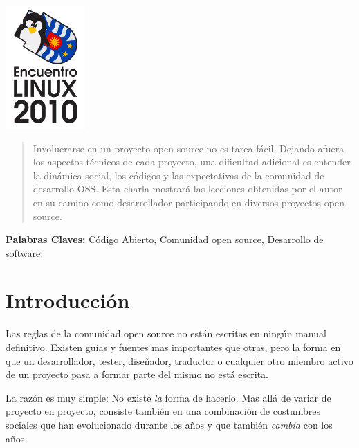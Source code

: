 \begin{minipage}{0.1in}
  \includegraphics[width=1.2in]{images/logo.png}
\end{minipage}
\hfill
\begin{minipage}{6in}
  \maketitle
\end{minipage}
\hfill
\begin{minipage}{7in}
\end{minipage}
  \thispagestyle{empty}

\begin{abstract}

  Involucrarse en un proyecto open source no es tarea fácil. Dejando afuera los
  aspectos técnicos de cada proyecto, una dificultad adicional es entender la
  dinámica social, los códigos y las expectativas de la comunidad de desarrollo
  OSS. Esta charla mostrará las lecciones obtenidas por el autor en su camino
  como desarrollador participando en diversos proyectos open source.

\end{abstract}

\textbf{Palabras Claves:} Código Abierto, Comunidad open source, Desarrollo de
software.

\section*{Introducción}

Las reglas de la comunidad open source no están escritas en ningún manual
definitivo. Existen guías y fuentes mas importantes que otras, pero la forma en
que un desarrollador, tester, diseñador, traductor o cualquier otro miembro
activo de un proyecto pasa a formar parte del mismo no está escrita.

La razón es muy simple: No existe \emph{la} forma de hacerlo. Mas allá de variar
de proyecto en proyecto, consiste también en una combinación de costumbres
sociales que han evolucionado durante los años y que también \emph{cambia} con
los años.

